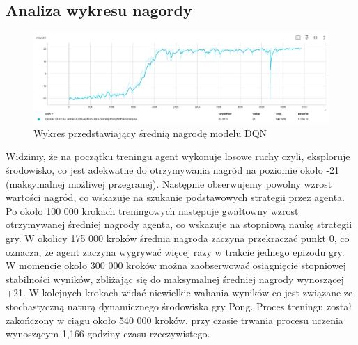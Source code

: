 \documentclass[a4paper, 12pt]{article}
\numberwithin{equation}{section}
\begin{document}
    \subsection{Analiza wykresu nagordy}
    \begin{figure}[htbp]
        \centering
        \includegraphics[width=\textwidth]{pictures/DQL_reward.png}
        \caption{Wykres przedstawiający średnią nagrodę modelu DQN}
        \label{fig:etykieta_obrazka}
    \end{figure}
    Widzimy, że na początku treningu agent wykonuje
    losowe ruchy czyli, eksploruje środowisko, co jest adekwatne do otrzymywania nagród na poziomie około -21 (maksymalnej możliwej przegranej). 
    Następnie obserwujemy powolny wzrost wartości nagród, co wskazuje na szukanie podstawowych strategii przez agenta. Po około 100 000 
    krokach treningowych następuje gwałtowny wzrost otrzymywanej średniej nagrody agenta, co wskazuje na stopniową naukę strategii gry.
    W okolicy 175 000 kroków średnia nagroda zaczyna przekraczać punkt 0, co oznacza, że agent zaczyna wygrywać więcej razy w trakcie jednego epizodu gry.
    W momencie około 300 000 kroków można zaobserwować osiągnięcie stopniowej stabilności wyników, zbliżając się do maksymalnej średniej nagrody wynoszącej +21.
    W kolejnych krokach widać niewielkie wahania wyników co jest związane ze stochastyczną naturą dynamicznego środowiska gry Pong.
    Proces treningu został zakończony w ciągu około 540 000 kroków, przy czasie trwania procesu uczenia wynoszącym 1,166 godziny czasu rzeczywistego.
\end{document}
